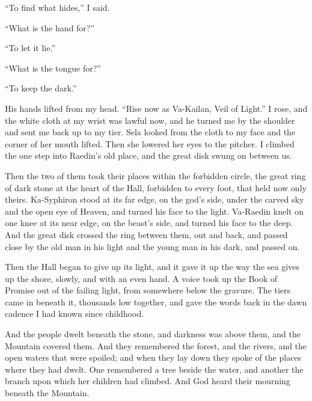 ``To find what hides,'' I said.\par

``What is the hand for?''\par

``To let it lie.''\par

``What is the tongue for?''\par

``To keep the dark.''\par

His hands lifted from my head. ``Rise now as Va-Kailan, Veil of Light.'' I rose, and the white cloth at my wrist was lawful now, and he turned me by the shoulder and sent me back up to my tier. Sela looked from the cloth to my face and the corner of her mouth lifted. Then she lowered her eyes to the pitcher. I climbed the one step into Raedin's old place, and the great disk swung on between us.\par

Then the two of them took their places within the forbidden circle, the great ring of dark stone at the heart of the Hall, forbidden to every foot, that held now only theirs. Ka-Syphiron stood at its far edge, on the god's side, under the carved sky and the open eye of Heaven, and turned his face to the light. Va-Raedin knelt on one knee at its near edge, on the beast's side, and turned his face to the deep. And the great disk crossed the ring between them, out and back, and passed close by the old man in his light and the young man in his dark, and passed on.\par

\ornament

Then the Hall began to give up its light, and it gave it up the way the sea gives up the shore, slowly, and with an even hand. A voice took up the Book of Promise out of the failing light, from somewhere below the gravure. The tiers came in beneath it, thousands low together, and gave the words back in the dawn cadence I had known since childhood.\par

\begin{scripture}
And the people dwelt beneath the stone, and darkness was above them, and the Mountain covered them. And they remembered the forest, and the rivers, and the open waters that were spoiled; and when they lay down they spoke of the places where they had dwelt. One remembered a tree beside the water, and another the branch upon which her children had climbed. And God heard their mourning beneath the Mountain.
\end{scripture}

